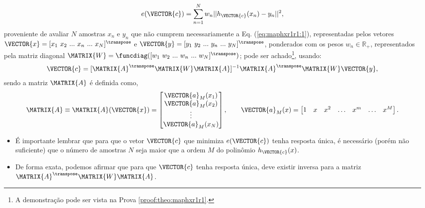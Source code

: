\begin{theorem}
\begin{equation}\label{eq:maphxr1r1:2}
e(\VECTOR{c}) =  \sum_{n=1}^{N} w_n||h_{\VECTOR{c}}(x_n)-y_n||^2,
\end{equation}
proveniente de avaliar $N$ amostras $x_n$ e $y_n$ que não cumprem necessariamente a Eq. (\ref{eq:maphxr1r1:1}), 
representadas pelos vetores $\VECTOR{x}=[x_1~ x_2~ ...~ x_n~ ...~ x_N]^{\transpose}$ e 
$\VECTOR{y}=[y_1~ y_2~ ...~ y_n~ ...~ y_N]^{\transpose}$,
ponderados com os pesos $w_n \in \mathbb{R}_+$, 
representados pela matriz diagonal $\MATRIX{W}=\funcdiag([w_1~ w_2~ ...~ w_n~ ...~ w_N]^{\transpose})$;
pode ser achado\footnote{A demonstração pode ser vista na Prova \ref{proof:theo:maphxr1r1}.}, usando:
\begin{equation}\label{eq:maphxr1r1:3}
\VECTOR{c}=[\MATRIX{A}^{\transpose}\MATRIX{W}\MATRIX{A}]^{-1}\MATRIX{A}^{\transpose}\MATRIX{W}\VECTOR{y},
\end{equation}
sendo a matriz $\MATRIX{A}$ é definida como,
\begin{equation}\label{eq:maphxr1r1:4}
\MATRIX{A}\equiv \MATRIX{A}(\VECTOR{x})=\begin{bmatrix}
\VECTOR{a}_M(x_1)\\
\VECTOR{a}_M(x_2)\\
\vdots\\
\VECTOR{a}_M(x_N)\\
\end{bmatrix}, \qquad
\VECTOR{a}_M(x)=\begin{bmatrix}
1& x& x^2& \hdots & x^m& \hdots& x^M
\end{bmatrix}.
\end{equation}

\end{theorem}


\begin{tcbattention}
\begin{itemize}
\item É importante lembrar que para que o vetor $\VECTOR{c}$
que minimiza $e(\VECTOR{c})$ tenha resposta única,
é necessário (porém não suficiente) que o número de amostras $N$ seja maior que a ordem $M$ do polinômio $h_{\VECTOR{c}}(x)$.

\item De forma exata, podemos afirmar que para que $\VECTOR{c}$ tenha resposta única,
deve existir inversa para a matriz $\MATRIX{A}^{\transpose}\MATRIX{W}\MATRIX{A}$.

\end{itemize}
\end{tcbattention}


